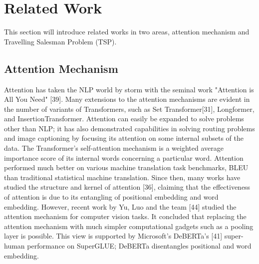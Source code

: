 \documentclass[10pt, conference, compsocconf]{IEEEtran}
\begin{document}
\section{Related Work}
This section will introduce related works in two areas, attention mechanism and Travelling Salesman Problem (TSP).
\subsection{Attention Mechanism}
Attention has taken the NLP world by storm with the seminal work "Attention is All You Need" [39]. Many extensions to the attention mechanisms are evident in the number of variants of Transformers, such as Set Transformer[31], Longformer, and InsertionTransformer. Attention can easily be expanded to solve problems other than NLP; it has also demonstrated capabilities in solving routing problems and image captioning by focusing its attention on some internal subsets of the data. The Transformer's self-attention mechanism is a weighted average importance score of its internal words concerning a particular word. Attention performed much better on various machine translation task benchmarks, BLEU than traditional statistical machine translation. Since then, many works have studied the structure and kernel of attention [36], claiming that the effectiveness of attention is due to its entangling of positional embedding and word embedding. However, recent work by Yu, Luo and the team [44] studied the attention mechanism for computer vision tasks. It concluded that replacing the attention mechanism with much simpler computational gadgets such as a pooling layer is possible. This view is supported by Microsoft's DeBERTa's [41] super-human performance on SuperGLUE; DeBERTa disentangles positional and word embedding. 
\end{document}
